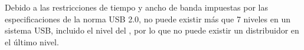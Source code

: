     Debido a las restricciones de tiempo y ancho de banda impuestas por las
    especificaciones de la norma USB 2.0, no puede existir más que 7 niveles
    en un sistema USB, incluido el nivel del \host, por lo que no puede existir
    un distribuidor en el último nivel.



